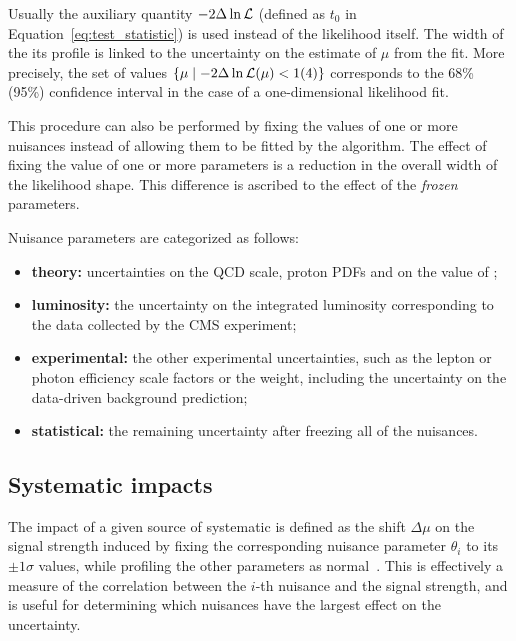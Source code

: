 Usually the auxiliary quantity $-2\Delta\ln\mathcal{L}$ (defined as $t_0$ in Equation~\ref{eq:test_statistic})
is used instead of the likelihood itself.
The width of the its profile is linked to the uncertainty on the estimate of $\mu$ from the fit.
More precisely, the set of values $\{ \mu \mid -2\Delta\ln\mathcal{L}(\mu) < 1 (4) \}$ corresponds to the 68\usep\% (95\usep\%) confidence interval
in the case of a one-dimensional likelihood fit.

This procedure can also be performed by fixing the values of one or more nuisances instead of allowing them to be fitted by the algorithm.
The effect of fixing the value of one or more parameters is a reduction in the overall width of the likelihood shape.
This difference is ascribed to the effect of the \textit{frozen} parameters.

Nuisance parameters are categorized as follows:
\begin{itemize}
\item \textbf{theory:} uncertainties on the QCD scale, proton PDFs and on the value of \alpS;
\item \textbf{luminosity:} the uncertainty on the integrated luminosity corresponding to the data collected by the CMS experiment;
\item \textbf{experimental:} the other experimental uncertainties, such as the lepton or photon efficiency scale factors or the \pileup{} weight,
      including the uncertainty on the data-driven background prediction;
\item \textbf{statistical:} the remaining uncertainty after freezing all of the nuisances.
\end{itemize}

\subsection{Systematic impacts}
\label{sec:systematic_impacts}
The impact of a given source of systematic is defined as the shift $\Delta\mu$ on the signal strength
induced by fixing the corresponding nuisance parameter $\theta_i$ to its $\pm 1 \sigma$ values,
while profiling the other parameters as normal~\cite{CERN-PH-EP-2014-214}.
This is effectively a measure of the correlation between the $i$-th nuisance and the signal strength,
and is useful for determining which nuisances have the largest effect on the uncertainty.
